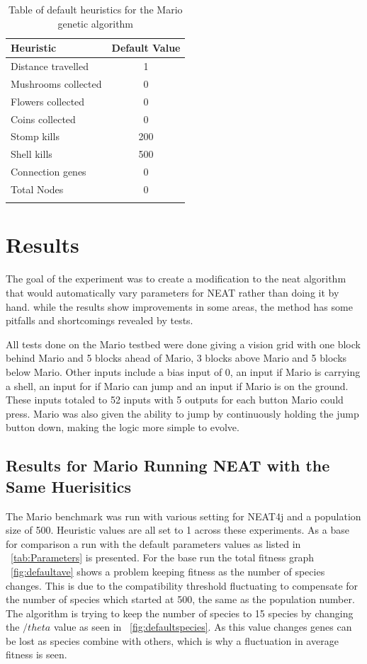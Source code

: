 \documentclass[12pt]{ucthesis} \newif\ifpdf \ifx\pdfoutput\undefined
\begin{document}
\begin{longtable}{| l | c |}
  \hline
  Heuristic & Default Value \\ \hline                   
  Distance travelled & 1  \\ \hline
  Mushrooms collected & 0 \\ \hline
  Flowers collected & 0  \\ \hline
  Coins collected & 0  \\ \hline
  Stomp kills & 200  \\ \hline
  Shell kills  & 500  \\ \hline
  Connection genes  & 0  \\ \hline
  Total Nodes  & 0  \\ \hline

\caption{Table of default heuristics for the Mario genetic
 algorithm}
\label{tab:Heuristics} 
\end{longtable}

\chapter{Results}

The goal of the experiment was to create a modification to the neat algorithm
that would automatically vary parameters for NEAT rather than doing it by hand.
while the results show improvements in some areas, the method has some pitfalls
and shortcomings revealed by tests.

All tests done on the Mario testbed were done giving a vision grid with one
block behind Mario and 5 blocks ahead of Mario, 3 blocks above Mario and 5
blocks below Mario. Other inputs include a bias input of 0, an input if Mario is
carrying a shell, an input for if Mario can jump and an input if Mario is on the
ground. These inputs totaled to 52 inputs with 5 outputs for each button Mario
could press. Mario was also given the ability to jump by continuously holding
the jump button down, making the logic more simple to evolve.

\section{Results for Mario Running NEAT with the Same Huerisitics}
The Mario benchmark was run with various setting for NEAT4j and a population
size of 500. Heuristic values are all set to 1 across these experiments. As a
base for comparison a run with the default parameters values as listed in
~\ref{tab:Parameters} is presented. For the base run the total fitness graph
~\ref{fig:defaultave} shows a problem keeping fitness as the number of species
changes. This is due to the compatibility threshold fluctuating to compensate
for the number of species which started at 500, the same as the population
number. The algorithm is trying to keep the number of species to 15 species by
changing the $/theta$ value as seen in ~\ref{fig:defaultspecies}. As this value
changes genes can be lost as species combine with others, which is why a
fluctuation in average fitness is seen.
\end{document}
